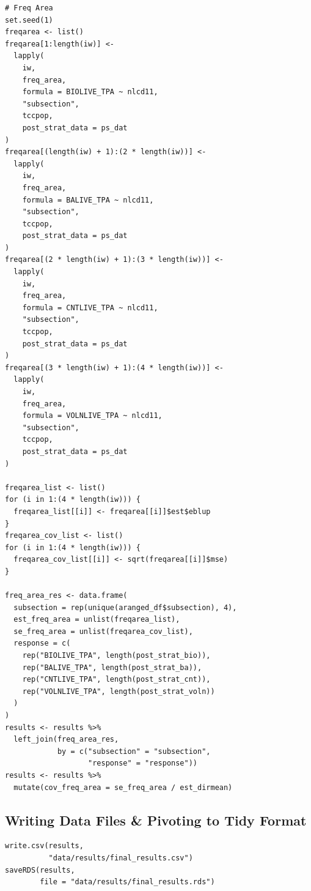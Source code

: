 \documentclass[12pt,twoside]{reedthesis}
\begin{document}
\begin{verbatim}
# Freq Area
set.seed(1)
freqarea <- list()
freqarea[1:length(iw)] <-
  lapply(
    iw,
    freq_area,
    formula = BIOLIVE_TPA ~ nlcd11,
    "subsection",
    tccpop,
    post_strat_data = ps_dat
)
freqarea[(length(iw) + 1):(2 * length(iw))] <- 
  lapply(
    iw,
    freq_area,
    formula = BALIVE_TPA ~ nlcd11,
    "subsection",
    tccpop,
    post_strat_data = ps_dat
)
freqarea[(2 * length(iw) + 1):(3 * length(iw))] <-
  lapply(
    iw,
    freq_area,
    formula = CNTLIVE_TPA ~ nlcd11,
    "subsection",
    tccpop,
    post_strat_data = ps_dat
)
freqarea[(3 * length(iw) + 1):(4 * length(iw))] <-
  lapply(
    iw,
    freq_area,
    formula = VOLNLIVE_TPA ~ nlcd11,
    "subsection",
    tccpop,
    post_strat_data = ps_dat
)

freqarea_list <- list()
for (i in 1:(4 * length(iw))) {
  freqarea_list[[i]] <- freqarea[[i]]$est$eblup
}
freqarea_cov_list <- list()
for (i in 1:(4 * length(iw))) {
  freqarea_cov_list[[i]] <- sqrt(freqarea[[i]]$mse)
}

freq_area_res <- data.frame(
  subsection = rep(unique(aranged_df$subsection), 4),
  est_freq_area = unlist(freqarea_list),
  se_freq_area = unlist(freqarea_cov_list),
  response = c(
    rep("BIOLIVE_TPA", length(post_strat_bio)),
    rep("BALIVE_TPA", length(post_strat_ba)),
    rep("CNTLIVE_TPA", length(post_strat_cnt)),
    rep("VOLNLIVE_TPA", length(post_strat_voln))
  )
)
results <- results %>%
  left_join(freq_area_res,
            by = c("subsection" = "subsection",
                   "response" = "response"))
results <- results %>%
  mutate(cov_freq_area = se_freq_area / est_dirmean)
\end{verbatim}
\hypertarget{writing-data-files-pivoting-to-tidy-format}{%
\subsection{Writing Data Files \& Pivoting to Tidy Format}\label{writing-data-files-pivoting-to-tidy-format}}
\begin{verbatim}
write.csv(results, 
          "data/results/final_results.csv")
saveRDS(results,
        file = "data/results/final_results.rds")
\end{verbatim}
\end{document}
